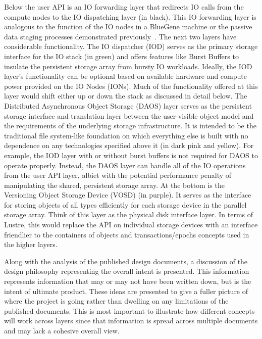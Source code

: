\documentclass[conference]{IEEEtran}
\begin{document}
Below the user API is an IO forwarding layer that redirects IO calls from the
compute nodes to the IO dispatching layer (in black).  This IO forwarding layer
is analogous to the function of the IO nodes in a BlueGene machine or the
passive data staging processes demonstrated
previously~\cite{nisar:2008:staging,Abbasi:2009:datatap}. The next two layers
have considerable functionality. The IO dispatcher (IOD) serves as the primary
storage interface for the IO stack (in green) and offers features like Burst
Buffers to insulate the persistent storage array from bursty IO workloads.
Ideally, the IOD layer's functionality can be optional based on available
hardware and compute power provided on the IO Nodes (IONs). Much of the
functionality offered at this layer would shift either up or down the stack as
discussed in detail below. The Distributed Asynchronous Object Storage (DAOS)
layer serves as the persistent storage interface and translation layer between
the user-visible object model and the requirements of the underlying storage
infrastructure. It is intended to be the traditional file system-like
foundation on which everything else is built with no dependence on any
technologies specified above it (in dark pink and yellow). For example, the IOD
layer with or without burst buffers is not required for DAOS to operate
properly.  Instead, the DAOS layer can handle all of the IO operations from the
user API layer, albiet with the potential performance penalty of manipulating
the shared, persistent storage array. At the bottom is the Versioning Object
Storage Device (VOSD) (in purple).  It serves as the interface for storing
objects of all types efficiently for each storage device in the parallel
storage array. Think of this layer as the physical disk interface layer. In
terms of Lustre, this would replace the API on individual storage devices with
an interface friendlier to the containers of objects and transactions/epochs
concepts used in the higher layers.

Along with the analysis of the published design documents, a discussion of the
design philosophy representing the overall intent is presented. This
information represents information that may or may not have been written down,
but is the intent of ultimate product.  These ideas are presented to give a
fuller picture of where the project is going rather than dwelling on any
limitations of the published documents. This is most important to illustrate
how different concepts will work across layers since that information is spread
across multiple documents and may lack a cohesive overall view.
\end{document}
